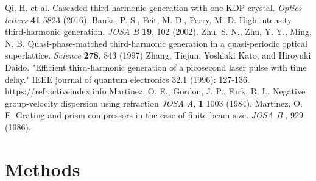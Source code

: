 \documentclass[a4paper, 12pt, onecolumn]{extarticle}
\begin{document}
\begin{thebibliography}{0}
 Qi, H. et al. Cascaded third-harmonic generation with one KDP crystal. \textit{Optics letters} \textbf{41} 5823 (2016).
 Banks, P. S., Feit, M. D., Perry, M. D. High-intensity third-harmonic generation. \textit{JOSA B} \textbf{19}, 102 (2002).
 Zhu, S. N., Zhu, Y. Y., Ming, N. B. Quasi-phase-matched third-harmonic generation in a quasi-periodic optical superlattice. \textit{Science} \textbf{278}, 843 (1997)
 Zhang, Tiejun, Yoshiaki Kato, and Hiroyuki Daido. "Efficient third-harmonic generation of a picosecond laser pulse with time delay." IEEE journal of quantum electronics 32.1 (1996): 127-136.
 https://refractiveindex.info
 Martinez, O. E., Gordon, J. P., Fork, R. L. Negative group-velocity dispersion using refraction \textit{JOSA A}, \textbf{1} 1003 (1984).
 Martinez, O. E. Grating and prism compressors in the case of finite beam size. \textit{JOSA B} , 929 (1986).
\end{thebibliography}
\section*{Methods}
\end{document}
